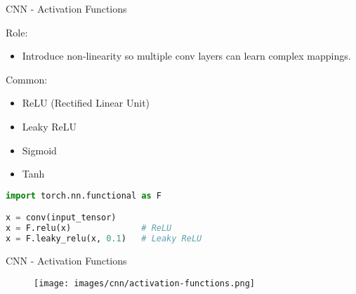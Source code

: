 \begin{frame}[fragile]{CNN - Activation Functions}
\begin{block}{Role:}
    \begin{itemize}
        \item Introduce non‑linearity so multiple conv layers can learn complex mappings.
    \end{itemize}
\end{block}

\begin{block}{Common:}
    \begin{itemize}
        \item ReLU (Rectified Linear Unit)
        \item Leaky ReLU
        \item Sigmoid
        \item Tanh
    \end{itemize}
\end{block}

\begin{lstlisting}[language=Python, caption={Code snippet (PyTorch)}, basicstyle=\ttfamily\footnotesize]
import torch.nn.functional as F

x = conv(input_tensor)
x = F.relu(x)              # ReLU
x = F.leaky_relu(x, 0.1)   # Leaky ReLU
\end{lstlisting}
\end{frame}  

\begin{frame}{CNN - Activation Functions}
    \begin{figure}
    \centering
    \texttt{[image: images/cnn/activation-functions.png]}
    \end{figure}
\end{frame}